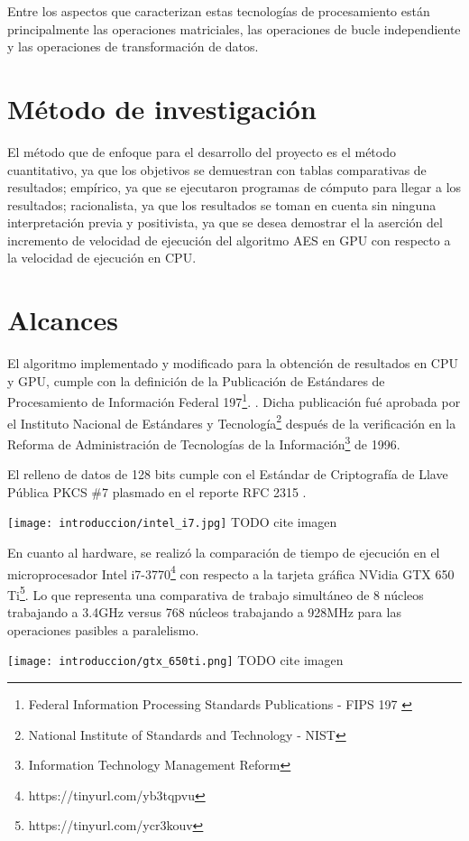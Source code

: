 \documentclass[../main.tex]{subfiles}
\begin{document}
  Entre los aspectos que caracterizan estas tecnologías de procesamiento están principalmente las operaciones matriciales, las operaciones de bucle independiente y las operaciones de transformación de datos.

  \section{Método de investigación}

  El método que de enfoque para el desarrollo del proyecto es el método cuantitativo, ya que los objetivos se demuestran con tablas comparativas de resultados; empírico, ya que se ejecutaron programas de cómputo para llegar a los resultados; racionalista, ya que los resultados se toman en cuenta sin ninguna interpretación previa y positivista, ya que se desea demostrar el la aserción del incremento de velocidad de ejecución del algoritmo AES en GPU con respecto a la velocidad de ejecución en CPU.

  \section{Alcances}

  El algoritmo implementado y modificado para la obtención de resultados en CPU y GPU, cumple con la definición de la Publicación de Estándares de Procesamiento de Información Federal 197\footnote{Federal Information Processing Standards Publications - FIPS 197 \cite{report:FIPS_197}}. \cite{report:FIPS_197}. Dicha publicación fué aprobada por el Instituto Nacional de Estándares y Tecnología\footnote{National
  Institute of Standards and Technology - NIST} después de la verificación en la Reforma de Administración de Tecnologías de la Información\footnote{Information Technology Management Reform} de 1996.

  El relleno de datos de 128 bits cumple con el Estándar de Criptografía de Llave Pública PKCS \#7 plasmado en el reporte RFC 2315 \cite{report:RFC_2315}.

  \texttt{[image: introduccion/intel\_i7.jpg]}
  TODO cite imagen

  En cuanto al hardware, se realizó la comparación de tiempo de ejecución en el microprocesador Intel i7-3770\footnote{https://tinyurl.com/yb3tqpvu} con respecto a la tarjeta gráfica NVidia GTX 650 Ti\footnote{https://tinyurl.com/ycr3kouv}. Lo que representa una comparativa de trabajo simultáneo de 8 núcleos trabajando a 3.4GHz versus 768 núcleos trabajando a 928MHz para las operaciones pasibles a paralelismo.

  \texttt{[image: introduccion/gtx\_650ti.png]}
  TODO cite imagen

  \bibliografia
\end{document}
